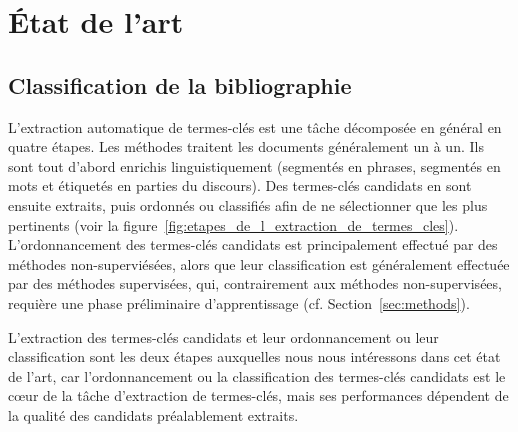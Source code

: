 \chapter{État de l'art}
\label{chap:etat_de_l_art}
  \section{Classification de la bibliographie}
    L'extraction automatique de termes-clés est une tâche décomposée en général
    en quatre étapes. Les méthodes traitent les documents généralement un à un.
    Ils sont tout d'abord enrichis linguistiquement (segmentés en phrases,
    segmentés en mots et étiquetés en parties du discours). Des termes-clés
    candidats en sont ensuite extraits, puis ordonnés ou classifiés afin de ne
    sélectionner que les plus pertinents (voir la
    figure~\ref{fig:etapes_de_l_extraction_de_termes_cles}). L'ordonnancement
    des termes-clés candidats est principalement effectué par des méthodes
    non-superviésées, alors que leur classification est généralement effectuée
    par des méthodes supervisées, qui, contrairement aux méthodes
    non-supervisées, requière une phase préliminaire d'apprentissage (cf.
    Section~\ref{sec:methods}).

    L'extraction des termes-clés candidats et leur ordonnancement ou leur
    classification sont les deux étapes auxquelles nous nous intéressons dans
    cet état de l'art, car l'ordonnancement ou la classification des
    termes-clés candidats est le c\oe{}ur de la tâche d'extraction de
    termes-clés, mais ses performances dépendent de la qualité des candidats
    préalablement extraits.

